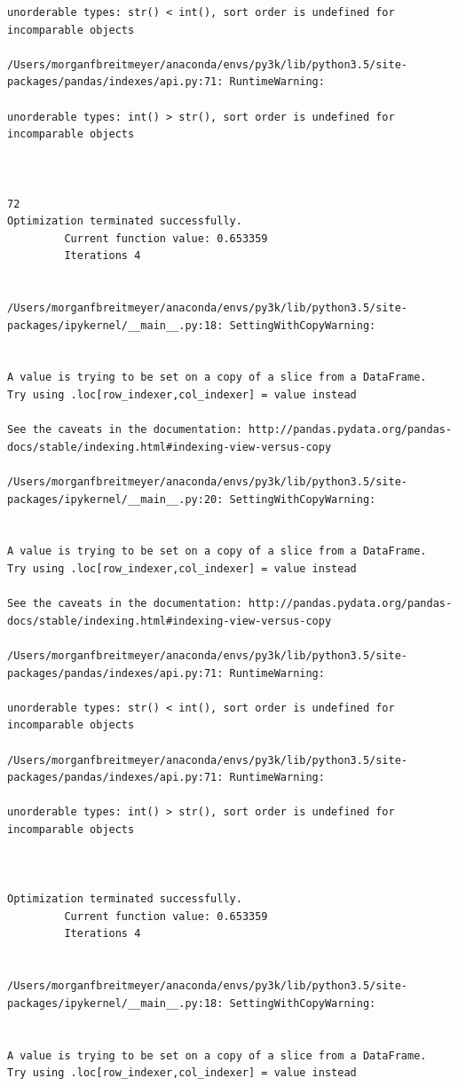 \begin{lstlisting}
unorderable types: str() < int(), sort order is undefined for incomparable objects

/Users/morganfbreitmeyer/anaconda/envs/py3k/lib/python3.5/site-packages/pandas/indexes/api.py:71: RuntimeWarning:

unorderable types: int() > str(), sort order is undefined for incomparable objects



72
Optimization terminated successfully.
         Current function value: 0.653359
         Iterations 4


/Users/morganfbreitmeyer/anaconda/envs/py3k/lib/python3.5/site-packages/ipykernel/__main__.py:18: SettingWithCopyWarning:


A value is trying to be set on a copy of a slice from a DataFrame.
Try using .loc[row_indexer,col_indexer] = value instead

See the caveats in the documentation: http://pandas.pydata.org/pandas-docs/stable/indexing.html#indexing-view-versus-copy

/Users/morganfbreitmeyer/anaconda/envs/py3k/lib/python3.5/site-packages/ipykernel/__main__.py:20: SettingWithCopyWarning:


A value is trying to be set on a copy of a slice from a DataFrame.
Try using .loc[row_indexer,col_indexer] = value instead

See the caveats in the documentation: http://pandas.pydata.org/pandas-docs/stable/indexing.html#indexing-view-versus-copy

/Users/morganfbreitmeyer/anaconda/envs/py3k/lib/python3.5/site-packages/pandas/indexes/api.py:71: RuntimeWarning:

unorderable types: str() < int(), sort order is undefined for incomparable objects

/Users/morganfbreitmeyer/anaconda/envs/py3k/lib/python3.5/site-packages/pandas/indexes/api.py:71: RuntimeWarning:

unorderable types: int() > str(), sort order is undefined for incomparable objects



Optimization terminated successfully.
         Current function value: 0.653359
         Iterations 4


/Users/morganfbreitmeyer/anaconda/envs/py3k/lib/python3.5/site-packages/ipykernel/__main__.py:18: SettingWithCopyWarning:


A value is trying to be set on a copy of a slice from a DataFrame.
Try using .loc[row_indexer,col_indexer] = value instead


\end{lstlisting}
